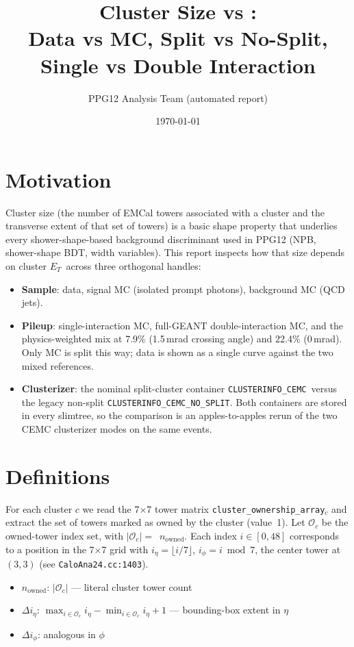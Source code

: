 \documentclass[11pt,a4paper]{article}
\title{Cluster Size vs \etg:\\
Data vs MC, Split vs No-Split, Single vs Double Interaction}
\author{PPG12 Analysis Team (automated report)}
\date{\today}
\newcommand{\etg}{$E_T$}
\newcommand{\nown}{$n_{\mathrm{owned}}$}
\newcommand{\dietag}{$\Delta i_\eta$}
\newcommand{\diphig}{$\Delta i_\phi$}
\newcommand{\splitnode}{\texttt{CLUSTERINFO\_CEMC}}
\newcommand{\nosplitnode}{\texttt{CLUSTERINFO\_CEMC\_NO\_SPLIT}}
\begin{document}
\maketitle

\section{Motivation}
\label{sec:intro}

Cluster size (the number of EMCal towers associated with a cluster and the
transverse extent of that set of towers) is a basic shape property that
underlies every shower-shape-based background discriminant used in PPG12
(NPB, shower-shape BDT, width variables).  This report inspects how that
size depends on cluster \etg\ across three orthogonal handles:
\begin{itemize}
\item \textbf{Sample}: data, signal MC (isolated prompt photons), background
  MC (QCD jets).
\item \textbf{Pileup}: single-interaction MC, full-GEANT double-interaction
  MC, and the physics-weighted mix at 7.9\% (1.5\,mrad crossing angle)
  and 22.4\% (0\,mrad).  Only MC is split this way; data is shown as a
  single curve against the two mixed references.
\item \textbf{Clusterizer}: the nominal split-cluster container
  \splitnode\ versus the legacy non-split \nosplitnode.  Both containers
  are stored in every slimtree, so the comparison is an apples-to-apples
  rerun of the two CEMC clusterizer modes on the same events.
\end{itemize}

\section{Definitions}
\label{sec:defs}

For each cluster $c$ we read the 7$\times$7 tower matrix
\texttt{cluster\_ownership\_array}$_c$ and extract the set of towers
marked as owned by the cluster (value~1).  Let $\mathcal{O}_c$ be the
owned-tower index set, with $|\mathcal{O}_c| = $~\nown.  Each index
$i \in [0,48]$ corresponds to a position in the 7$\times$7 grid with
$i_\eta = \lfloor i/7 \rfloor$, $i_\phi = i \bmod 7$, the center tower
at $(3,3)$ (see \texttt{CaloAna24.cc:1403}).

\begin{itemize}
\item \nown: $|\mathcal{O}_c|$ --- literal cluster tower count
\item \dietag: $\max_{i\in\mathcal{O}_c} i_\eta - \min_{i\in\mathcal{O}_c} i_\eta + 1$
  --- bounding-box extent in $\eta$
\item \diphig: analogous in $\phi$
\end{itemize}
\end{document}
